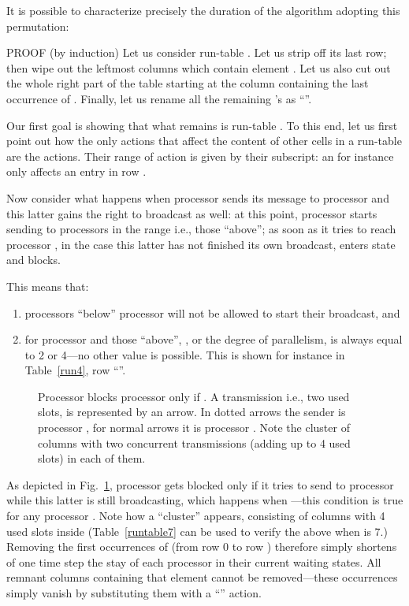 \documentclass{elsart}
\begin{document}
It is possible to characterize precisely the duration of
the algorithm adopting this permutation: \begin{prop}\label{prop1}

\end{prop}
\begin{pf*}{PROOF (by induction)}
Let us consider run-table . Let us strip off its last row; 
then wipe out 
the  leftmost columns which contain element . 
Let us also cut out the whole right part of the table starting
at the column containing the last occurrence of . Finally, let us rename all
the remaining 's as ``''.

Our first goal is showing that what remains is run-table .
To this end, let us first point out how
the only actions that affect the content of other cells in a run-table
are the  actions. Their range of action is given by their subscript:
an  for instance only affects an entry in row .

Now consider what happens when processor  sends its message to 
processor  and this latter gains the right to broadcast as well:
at this point, processor  starts sending to processors in the
range  i.e., those ``above''; as soon as it
tries to reach processor , in the case this latter has not
finished its own broadcast,  enters state  and blocks.

This means that:
\begin{enumerate}
\item processors ``below'' processor  will not be allowed
to start their broadcast, and
\item for processor  and those ``above'', , or the degree of parallelism,
is always equal to 2 or 4---no other value is possible.
This is shown for instance in Table~\ref{run4}, row ``''.
\end{enumerate}

\begin{figure}[h]
\centerline{}
\caption{Processor  blocks processor  only if . 
A transmission i.e.,  two used slots, is represented by an arrow.
In dotted arrows the sender is processor , for normal arrows
it is processor .
Note the cluster of  columns with two concurrent transmissions
(adding up to 4 used slots) in each of them.}
\label{f-prop1}
\end{figure}

As depicted in Fig.~\ref{f-prop1}, processor  gets blocked
only if it tries to send to processor  while this latter
is still broadcasting, which happens
when ---this condition is true for any
processor . Note how
a ``cluster'' appears, consisting of  columns with 4 used slots inside
(Table~\ref{runtable7} can be used to verify the above when  is 7.)
Removing the first  occurrences
of  (from row 0 to row )
therefore simply shortens of one time step the stay
of each processor in their current waiting states.
All remnant columns containing that element cannot be removed---these
occurrences simply vanish by substituting them with a ``'' action.


\end{pf*}
\end{document}
